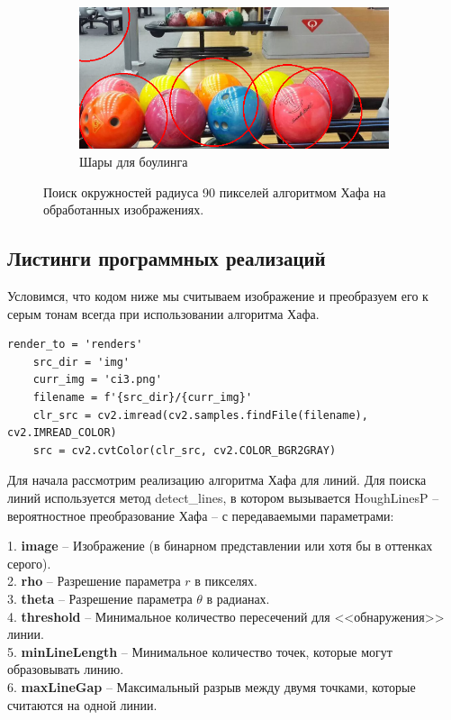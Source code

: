 \documentclass[a4paper, 16pt]{article}
\begin{document}
\begin{figure}[htbp]
\begin{subfigure}{0.3\textwidth}
        \end{subfigure}
        \hfill
        \begin{subfigure}{0.3\textwidth}
            \centering
            \includegraphics[width=\linewidth]{canny_hc_r=90_ci3.png}
            \caption{Шары для боулинга}
            \label{fig:canny_hc_r90_ci3}
        \end{subfigure}
        \caption{Поиск окружностей радиуса 90 пикселей алгоритмом Хафа на обработанных изображениях.}
        \label{fig:canny_hc_r90_cis}
    \end{figure}


    \subsection{Листинги программных реализаций}
    \noindent Условимся, что кодом ниже мы считываем изображение и преобразуем его к серым тонам всегда при использовании алгоритма Хафа.
    \begin{lstlisting}[label=code0, caption={Считывание изображения и преобразование к серым тонам.}]
    render_to = 'renders'
    src_dir = 'img'
    curr_img = 'ci3.png'
    filename = f'{src_dir}/{curr_img}'
    clr_src = cv2.imread(cv2.samples.findFile(filename), cv2.IMREAD_COLOR)
    src = cv2.cvtColor(clr_src, cv2.COLOR_BGR2GRAY)
    \end{lstlisting}


    \noindent Для начала рассмотрим реализацию алгоритма Хафа для линий. Для поиска линий используется метод detect\_{lines}, в котором
    вызывается HoughLinesP -- вероятностное преобразование Хафа -- с передаваемыми параметрами:
    \begin{center}
    1. \textbf{image} -- Изображение (в бинарном представлении или хотя бы в оттенках серого).\\
    2. \textbf{rho} -- Разрешение параметра $r$ в пикселях.\\
    3. \textbf{theta} -- Разрешение параметра $\theta$ в радианах.\\
    4. \textbf{threshold} -- Минимальное количество пересечений для <<обнаружения>> линии.\\
    5. \textbf{minLineLength} -- Минимальное количество точек, которые могут образовывать линию.\\
    6. \textbf{maxLineGap} -- Максимальный разрыв между двумя точками, которые считаются на одной линии.
    \end{center}
\end{document}
